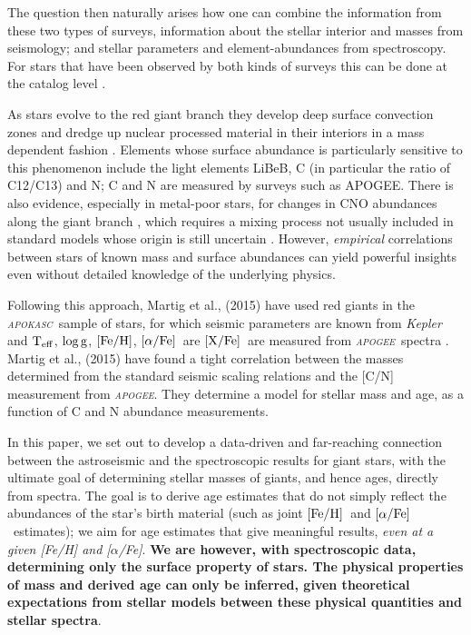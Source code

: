 \documentclass[12pt, preprint]{aastex}
\newcommand{\project}[1]{\textsl{#1}}
\newcommand{\apogee}{\project{\textsc{apogee}}}
\newcommand{\apokasc}{\project{\textsc{apokasc}}}
\newcommand{\kepler}{\project{Kepler}}
\newcommand{\teff}{\mbox{$\rm T_{eff}$}}
\newcommand{\feh}{\mbox{$\rm [Fe/H]$}}
\newcommand{\xfe}{\mbox{$\rm [X/Fe]$}}
\newcommand{\alphafe}{\mbox{$\rm [\alpha/Fe]$}}
\newcommand{\logg}{\mbox{$\rm \log g$}}
\begin{document}
The question then naturally arises how one can combine the information from these two types of surveys, information about the stellar interior and masses from seismology; and
stellar parameters and element-abundances from spectroscopy. For stars that have been observed by both kinds of surveys this can be done at the catalog level \citep{Martig2014}.

As stars evolve to the red giant branch they develop deep surface convection zones and dredge up nuclear processed material in their interiors in a mass dependent fashion \citep{Iben1967}.  Elements whose surface abundance is particularly sensitive to this phenomenon include the light elements LiBeB, C (in particular the ratio of C12/C13) and N; C and N are measured by surveys such as APOGEE.  There is also evidence, especially in metal-poor stars, for changes in CNO abundances along the giant branch \citep{Kraft1994}, which requires a mixing process not usually included in standard models whose origin is still uncertain \citep{A2012}.  However, \textit{empirical} correlations between stars of known mass and surface abundances can yield powerful insights even without detailed knowledge of the underlying physics.

Following this approach, Martig et al., (2015) have used red giants in the \apokasc\ sample of stars, for which seismic parameters are known from \kepler\ \citep{P2014} and \teff, \logg, \feh, \alphafe\  are \xfe\ are measured from \apogee\ spectra \citep{Ahn2014}. Martig et al., (2015) have found a tight correlation between the masses determined from the standard seismic scaling relations and the [C/N] measurement from \apogee.  They determine a model for stellar mass and age, as a function of C and N abundance measurements. 

In this paper, we set out to develop a data-driven and far-reaching connection between the astroseismic and the spectroscopic results for giant stars, with the ultimate goal of determining stellar masses of giants, and hence ages, directly from spectra. The goal is to derive age estimates that do not simply reflect the abundances of the star's birth material (such as joint \feh\ and \alphafe\ estimates); we aim for age estimates that give meaningful results, {\sl even at a given [Fe/H] and [$\alpha$/Fe]}. \textbf{We are however, with spectroscopic data, determining only the surface property of stars. The physical properties of mass and derived age can only be inferred, given theoretical expectations from stellar models between these physical quantities and stellar spectra}.
\end{document}
